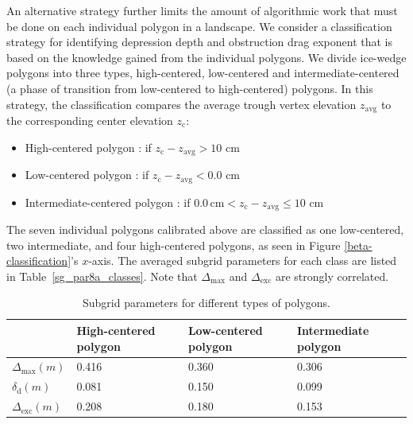 \documentclass[review,11pt]{elsarticle}
\begin{document}
An alternative strategy further limits the amount of algorithmic work that must be done on each individual polygon in a landscape.  
We consider a classification strategy for identifying depression depth and obstruction drag exponent that is based on the knowledge gained from the individual polygons.
We divide ice-wedge polygons into three types, high-centered, low-centered and intermediate-centered (a phase of transition from low-centered to high-centered) polygons. 
In this strategy, the classification compares the average trough vertex elevation $z_\text{avg}$ to the corresponding center elevation $z_\text{c}$:
%
\begin{itemize}
\item High-centered polygon : if $z_\text{c} - z_\text{avg} > 10$ cm
\item Low-centered polygon : if $z_\text{c} - z_\text{avg} < 0.0$ cm
\item Intermediate-centered polygon : if $ 0.0 \, \text{cm} <  z_\text{c} - z_\text{avg} \leq 10$ cm
\end{itemize}
%
The seven individual polygons calibrated above are classified as one low-centered, two intermediate, and four high-centered polygons, as seen in Figure \ref{beta-classification}'s $x$-axis.
The averaged subgrid parameters for each class are listed in Table~\ref{sg_par8a_classes}.
Note that $\Delta_\text{max}$ and $\Delta_\text{exc}$ are strongly correlated.
%
\begin{table}[!h]
\centering
\caption{Subgrid parameters for different types of polygons.}
\begin{tabular}{|p{}|p{2.5cm}|p{2.5cm}|p{2.5cm}|} 
\hline
 & High-centered polygon & Low-centered polygon & Intermediate polygon \\ \hline
$\Delta_\text{max}(m)$ & 0.416 & 0.360 & 0.306  \\
$\delta_\text{d}(m)$ & 0.081 & 0.150 & 0.099 \\
$\Delta_\text{exc}(m)$ & 0.208 & 0.180 & 0.153  \\ \hline
\end{tabular}
\label{sg_para_classes}
\end{table}
\end{document}
